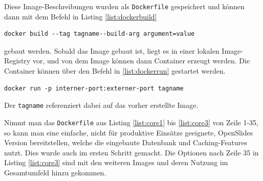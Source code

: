 \documentclass[11pt,a4paper]{article}
\begin{document}
Diese Image-Beschreibungen wurden als \texttt{Dockerfile} gespeichert und 
können dann mit dem Befehl in Listing \ref{list:dockerbuild}
\begin{lstlisting}[numbers=none,
	caption=Befehl zum erzeugen eines Images,
	label={list:dockerbuild}]
docker build --tag tagname--build-arg argument=value
\end{lstlisting}
gebaut werden. Sobald das Image gebaut ist, liegt es in einer lokalen 
Image-Registry vor, und von dem Image können dann Container erzeugt werden. Die 
Container können über den Befehl in \ref{list:dockerrun} gestartet werden.
\begin{lstlisting}[numbers=none,
	caption=Befehl zum starten eines Containers,
	label={list:dockerrun}]
docker run -p interner-port:externer-port tagname
\end{lstlisting}
\texttt{}
Der \texttt{tagname} referenziert dabei auf das vorher erstellte 
Image.

Nimmt man das \texttt{Dockerfile} aus Listing \ref{list:core1} bis 
\ref{list:core3} von Zeile 1-35, so kann man eine einfache, nicht für 
produktive Einsätze geeignete, OpenSlides Version bereitstellen, welche die 
eingebaute Datenbank und Caching-Features nutzt. Dies wurde auch im ersten 
Schritt gemacht. Die Optionen nach Zeile 35 in Listing \ref{list:core3} sind 
mit den weiteren Images und deren Nutzung im Gesamtumfeld hinzu gekommen.
\end{document}
